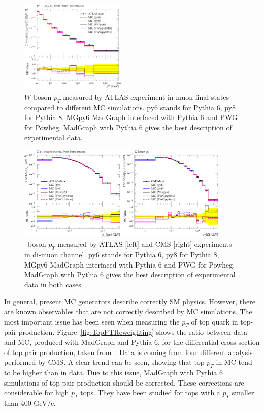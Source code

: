 \begin{figure}[!Hhtbp]
  \begin{center}
    \includegraphics[width=0.45\textwidth]{figs/Wpt_rivet.png}
    \caption{$W$ boson $p_{T}$ measured by ATLAS experiment in muon final states compared to different MC simulations. py6 stands for Pythia 6, py8 for Pythia 8, MGpy6 MadGraph interfaced with Pythia 6 and PWG for Powheg. MadGraph with Pythia 6 gives the best description of experimental data.}
    \label{fig:WVal}
  \end{center}
\end{figure}

\begin{figure}[!Hhtbp]
  \begin{center}
    \includegraphics[width=0.9\textwidth]{figs/Zpt_rivet.png}
    \caption{\Z~boson $p_{T}$ measured by ATLAS [left] and CMS [right] experiments in di-muon channel. py6 stands for Pythia 6, py8 for Pythia 8, MGpy6 MadGraph interfaced with Pythia 6 and PWG for Powheg. MadGraph with Pythia 6 gives the best description of experimental data in both cases.}
    \label{fig:ZVal}
  \end{center}
\end{figure}

In general, present MC generators describe correctly SM physics. However, there are known observables that are not correctly described by MC simulations. The most important issue has been seen when measuring the $p_{T}$ of top quark in top-pair production. Figure~\ref{fig:TopPTReweighting} shows the ratio between data and MC, produced with MadGraph and Pythia 6, for the differential cross section of top pair production, taken from~\cite{Chatrchyan:2012saa,Chatrchyan:2013boa,Khachatryan:2015oqa}. Data is coming from four different analysis performed by CMS. A clear trend can be seen, showing that top $p_{T}$ in MC tend to be higher than in data. Due to this issue, MadGraph with Pythia 6 simulations of top pair production should be corrected. These corrections are considerable for high $p_{T}$ tops. They have been studied for tops with a $p_{T}$ smaller than 400 GeV/c.

